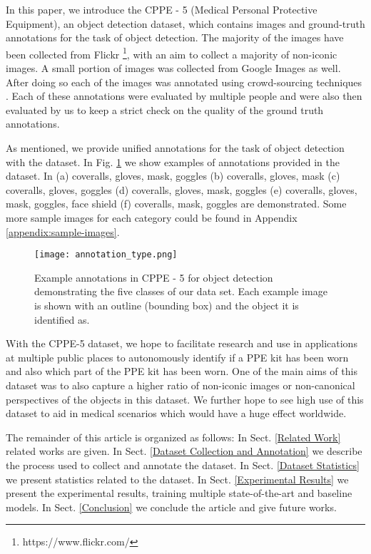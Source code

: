 \documentclass{article}
\begin{document}
In this paper, we introduce the CPPE - 5 (Medical Personal Protective Equipment), an object detection dataset, which contains images and ground-truth annotations for the task of object detection. The majority of the images have been collected from Flickr \footnote{https://www.flickr.com/}, with an aim to collect a majority of non-iconic images. A small portion of images was collected from Google Images as well. After doing so each of the images was annotated using crowd-sourcing techniques \cite{vaughan2017making}. Each of these annotations were evaluated by multiple people and were also then evaluated by us to keep a strict check on the quality of the ground truth annotations.

As mentioned, we provide unified annotations for the task of object detection with the dataset. In Fig. \ref{fig:annotation-ex} we show examples of annotations provided in the dataset. In (a) coveralls, gloves, mask, goggles (b) coveralls, gloves, mask (c) coveralls, gloves, goggles (d) coveralls, gloves, mask, goggles (e) coveralls, gloves, mask, goggles, face shield (f) coveralls, mask, goggles are demonstrated. Some more sample images for each category could be found in Appendix \ref{appendix:sample-images}.

\begin{figure}
    \centering
    \texttt{[image: annotation\_type.png]}
    \caption{Example annotations in CPPE - 5 for object detection demonstrating the five classes of our data set. Each example image is shown with an outline (bounding box) and the object it is identified as.}
  \label{fig:annotation-ex}
\end{figure}

With the CPPE-5 dataset, we hope to facilitate research and use in applications at multiple public places to autonomously identify if a PPE kit has been worn and also which part of the PPE kit has been worn. One of the main aims of this dataset was to also capture a higher ratio of non-iconic images or non-canonical perspectives \cite{CUTZU19943037} of the objects in this dataset. We further hope to see high use of this dataset to aid in medical scenarios which would have a huge effect worldwide.

The remainder of this article is organized as follows: In Sect. \ref{Related Work} related works are given. In Sect. \ref{Dataset Collection and Annotation} we describe the process used to collect and annotate the dataset. In Sect. \ref{Dataset Statistics} we present statistics related to the dataset. In Sect. \ref{Experimental Results} we present the experimental results, training multiple state-of-the-art and baseline models. In Sect. \ref{Conclusion} we conclude the article and give future works.
\end{document}
